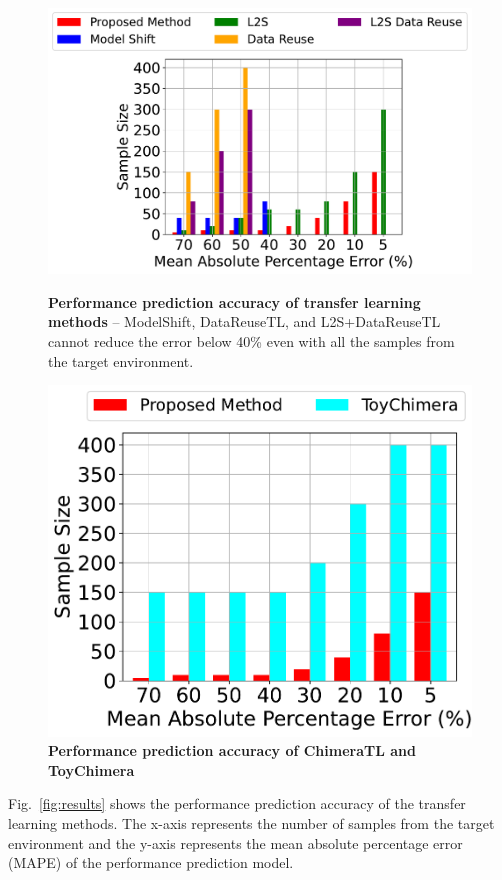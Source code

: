 \begin{figure}[th]
    \centering
    \begin{minipage}{.45\textwidth}
        \centering
        \includegraphics[width=1\linewidth]{src/fig/tl_bar.pdf}
        \caption{\textbf{Performance prediction accuracy of transfer learning methods} -- ModelShift, DataReuseTL, and L2S+DataReuseTL cannot reduce the error below 40\% even with all the samples from the target environment.}
        \label{fig:results}
    \end{minipage}%
    \hfill
    \begin{minipage}{.45\textwidth}
        \centering
        \includegraphics[width=.7\linewidth]{src/fig/toy_bar.pdf}
        \caption{\textbf{Performance prediction accuracy of ChimeraTL and ToyChimera}}
        \label{fig:toy}
    \end{minipage}
\end{figure}

Fig.~\ref{fig:results} shows the performance prediction accuracy of the transfer learning methods.
The x-axis represents the number of samples from the target environment and the y-axis represents the mean absolute percentage error (MAPE)\cite{Valov, l2s, mape} of the performance prediction model.


